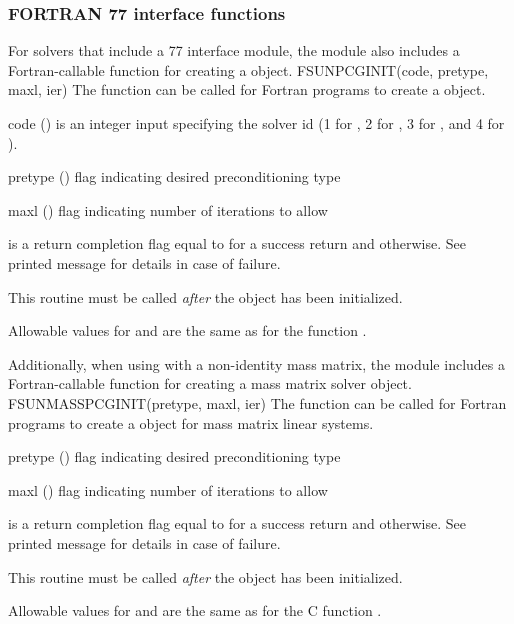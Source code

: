 \subsubsection*{FORTRAN 77 interface functions}
For solvers that include a {\F} 77 interface module, the
{\sunlinsolpcg} module also includes a Fortran-callable function
for creating a  object.
%
%
{
  FSUNPCGINIT(code, pretype, maxl, ier)
}
{
  The function  can be called for Fortran programs
  to create a {\sunlinsolpcg} object.
}
{
  \begin{args}[pretype]
  \item[code] ()
    is an integer input specifying the solver id (1 for {\cvode}, 2
    for {\ida}, 3 for {\kinsol}, and 4 for {\arkode}).
  \item[pretype] ()
    flag indicating desired preconditioning type
  \item[maxl] ()
    flag indicating number of iterations to allow
  \end{args}
}
{
   is a return completion flag equal to  for a success
  return and  otherwise. See printed message for details in case
  of failure.
}
{
  This routine must be called \emph{after} the {\nvector} object has
  been initialized.

  Allowable values for  and  are the same as for
  the {\CC} function .
}
Additionally, when using {\arkode} with a non-identity
mass matrix, the {\sunlinsolpcg} module includes a Fortran-callable
function for creating a  mass matrix solver
object.
%
%
{
  FSUNMASSPCGINIT(pretype, maxl, ier)
}
{
  The function  can be called for Fortran programs
  to create a {\sunlinsolpcg} object for mass matrix linear systems.
}
{
  \begin{args}[pretype]
  \item[pretype] ()
    flag indicating desired preconditioning type
  \item[maxl] ()
    flag indicating number of iterations to allow
  \end{args}
}
{
   is a  return completion flag equal to  for a success
  return and  otherwise. See printed message for details in case
  of failure.
}
{
  This routine must be called \emph{after} the {\nvector} object has
  been initialized.

  Allowable values for  and  are the same as for
  the C function .
}
